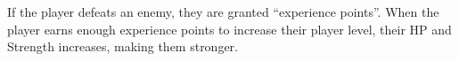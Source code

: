 \documentclass[11pt,a4paper]{article}
\begin{document}
    If the player defeats an enemy, they are granted ``experience points''.
    When the player earns enough experience points to increase their player level, their HP and Strength increases, making them stronger.







\end{document}

